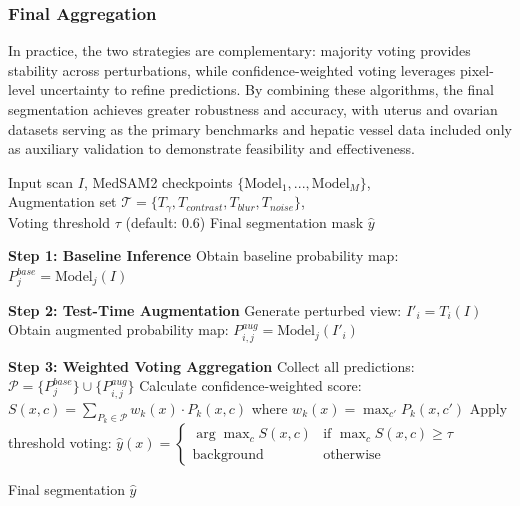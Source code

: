\documentclass{article}
\begin{document}
\subsubsection{Final Aggregation}
In practice, the two strategies are complementary: majority voting provides stability across perturbations, while confidence-weighted voting leverages pixel-level uncertainty to refine predictions. By combining these algorithms, the final segmentation achieves greater robustness and accuracy, with uterus and ovarian datasets serving as the primary benchmarks and hepatic vessel data included only as auxiliary validation to demonstrate feasibility and effectiveness.

\begin{algorithm}[H]
\caption{SegTTA: Test-Time Augmentation for Medical Segmentation}
\label{alg:segtta}
\begin{algorithmic}[1]
\REQUIRE Input scan $I$, MedSAM2 checkpoints $\{\text{Model}_1, ..., \text{Model}_M\}$, \\
         Augmentation set $\mathcal{T} = \{T_{\gamma}, T_{contrast}, T_{blur}, T_{noise}\}$, \\
         Voting threshold $\tau$ (default: 0.6)
\ENSURE Final segmentation mask $\hat{y}$

\STATE \textbf{Step 1: Baseline Inference}
    \STATE Obtain baseline probability map: $P_j^{base} = \text{Model}_j(I)$
\ENDFOR

\STATE \textbf{Step 2: Test-Time Augmentation}
    \STATE Generate perturbed view: $I'_i = T_i(I)$
        \STATE Obtain augmented probability map: $P_{i,j}^{aug} = \text{Model}_j(I'_i)$
    \ENDFOR
\ENDFOR

\STATE \textbf{Step 3: Weighted Voting Aggregation}
\STATE Collect all predictions: $\mathcal{P} = \{P_j^{base}\} \cup \{P_{i,j}^{aug}\}$
    \STATE Calculate confidence-weighted score:
    \STATE \quad $S(x,c) = \sum_{P_k \in \mathcal{P}} w_k(x) \cdot P_k(x,c)$
    \STATE \quad where $w_k(x) = \max_{c'} P_k(x,c')$
    \STATE Apply threshold voting:
    \STATE \quad $\hat{y}(x) = \begin{cases} 
                  \arg\max_{c} S(x,c) & \text{if } \max_c S(x,c) \geq \tau \\
                  \text{background} & \text{otherwise}
                  \end{cases}$
\ENDFOR

\RETURN Final segmentation $\hat{y}$
\end{algorithmic}
\end{algorithm}
\end{document}
